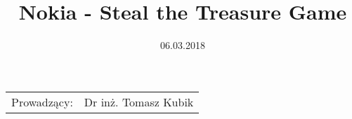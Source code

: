 \documentclass{article}
\title{Nokia - Steal the Treasure Game \\ \textit{ }} %
\date{06.03.2018}
\begin{document}
\maketitle

\begin{center}
\begin{tabular}{l r}
Prowadzący: & Dr inż. Tomasz Kubik
\end{tabular}
\end{center}

\tableofcontents








\newpage
\end{document}
